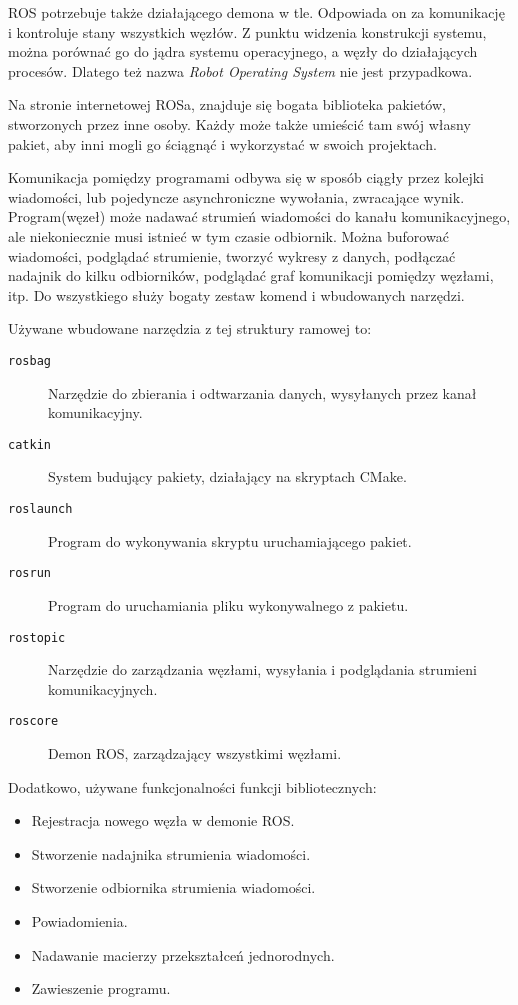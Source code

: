 	ROS potrzebuje także działającego demona w tle. Odpowiada on za komunikację i kontroluje stany wszystkich węzłów.
	Z punktu widzenia konstrukcji systemu, można porównać go do jądra systemu operacyjnego, a węzły do działających procesów.
	Dlatego też nazwa \emph{Robot Operating System} nie jest przypadkowa.
		
	Na stronie internetowej ROSa, znajduje się bogata biblioteka pakietów, stworzonych przez inne osoby.
	Każdy może także umieścić tam swój własny pakiet, aby inni mogli go ściągnąć i wykorzystać w swoich projektach.

	Komunikacja pomiędzy programami odbywa się w sposób ciągły przez kolejki wiadomości, lub pojedyncze asynchroniczne wywołania, zwracające wynik.
	Program(węzeł) może nadawać strumień wiadomości do kanału komunikacyjnego, ale niekoniecznie musi istnieć w tym czasie odbiornik.
	Można buforować wiadomości, podglądać strumienie, tworzyć wykresy z danych, podłączać nadajnik do kilku odbiorników, podglądać graf komunikacji pomiędzy węzłami, itp.
	Do wszystkiego służy bogaty zestaw komend i wbudowanych narzędzi.
	
	Używane wbudowane narzędzia z tej struktury ramowej to:
	\begin{description}
		\item[\texttt{rosbag}] Narzędzie do zbierania i odtwarzania danych, wysyłanych przez kanał komunikacyjny.
		\item[\texttt{catkin}] System budujący pakiety, działający na skryptach CMake.
		\item[\texttt{roslaunch}] Program do wykonywania skryptu uruchamiającego pakiet.
		\item[\texttt{rosrun}] Program do uruchamiania pliku wykonywalnego z pakietu.
		\item[\texttt{rostopic}] Narzędzie do zarządzania węzłami, wysyłania i podglądania strumieni komunikacyjnych.
		\item[\texttt{roscore}] Demon ROS, zarządzający wszystkimi węzłami.
	\end{description}
	Dodatkowo, używane funkcjonalności funkcji bibliotecznych:
	\begin{itemize}
		\item Rejestracja nowego węzła w demonie ROS.
		\item Stworzenie nadajnika strumienia wiadomości.
		\item Stworzenie odbiornika strumienia wiadomości.
		\item Powiadomienia.
		\item Nadawanie macierzy przekształceń jednorodnych.
		\item Zawieszenie programu.
	\end{itemize}


